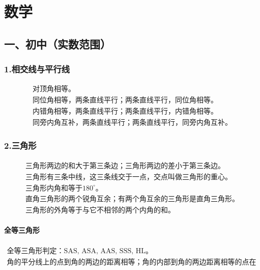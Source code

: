 \documentclass{ctexart}
\begin{document}
\section*{数学}

\subsection*{一、初中（实数范围）}

\subsubsection*{1.相交线与平行线}
\begin{gather*}
\text{对顶角相等。} \\
\text{同位角相等，两条直线平行；两条直线平行，同位角相等。} \\
\text{内错角相等，两条直线平行；两条直线平行，内错角相等。} \\
\text{同旁内角互补，两条直线平行；两条直线平行，同旁内角互补。}
\end{gather*}
\subsubsection*{2.三角形}
\begin{gather*}
\text{三角形两边的和大于第三条边；三角形两边的差小于第三条边。} \\
\text{三角形有三条中线，这三条线交于一点，交点叫做三角形的重心。} \\
\text{三角形内角和等于$180^\circ$。} \\
\text{直角三角形的两个锐角互余；有两个角互余的三角形是直角三角形。} \\
\text{三角形的外角等于与它不相邻的两个内角的和。}
\end{gather*}
\paragraph{全等三角形}
\begin{gather*}
\text{全等三角形判定：SAS, ASA, AAS, SSS, HL。} \\
\text{角的平分线上的点到角的两边的距离相等；角的内部到角的两边距离相等的点在角的平分线上。}
\end{gather*}
\end{document}
